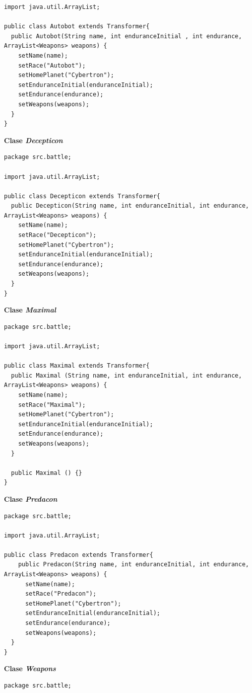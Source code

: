 \documentclass[12pt]{article}
\begin{document}
\begin{enumerate}[label = \arabic{enumi}]
\begin{lstlisting}
import java.util.ArrayList;

public class Autobot extends Transformer{
  public Autobot(String name, int enduranceInitial , int endurance, ArrayList<Weapons> weapons) {
    setName(name);
    setRace("Autobot");
    setHomePlanet("Cybertron");
    setEnduranceInitial(enduranceInitial);
    setEndurance(endurance);
    setWeapons(weapons);
  }
}    
    \end{lstlisting}
    
    \textbf{Clase \textit{Decepticon}}
    \begin{lstlisting}
package src.battle;

import java.util.ArrayList;

public class Decepticon extends Transformer{
  public Decepticon(String name, int enduranceInitial, int endurance, ArrayList<Weapons> weapons) {
    setName(name);
    setRace("Decepticon");
    setHomePlanet("Cybertron");
    setEnduranceInitial(enduranceInitial);
    setEndurance(endurance);
    setWeapons(weapons);
  }
}    
    \end{lstlisting}

    \textbf{Clase \textit{Maximal}} 
    \begin{lstlisting}
package src.battle;

import java.util.ArrayList;

public class Maximal extends Transformer{
  public Maximal (String name, int enduranceInitial, int endurance, ArrayList<Weapons> weapons) {
    setName(name);
    setRace("Maximal");
    setHomePlanet("Cybertron");
    setEnduranceInitial(enduranceInitial);
    setEndurance(endurance);
    setWeapons(weapons);
  }

  public Maximal () {}
}
    \end{lstlisting}

    \textbf{Clase \textit{Predacon}}
    \begin{lstlisting}
package src.battle;

import java.util.ArrayList;

public class Predacon extends Transformer{
    public Predacon(String name, int enduranceInitial, int endurance, ArrayList<Weapons> weapons) {
      setName(name);
      setRace("Predacon");
      setHomePlanet("Cybertron");
      setEnduranceInitial(enduranceInitial);
      setEndurance(endurance);
      setWeapons(weapons);
  }
}
    \end{lstlisting}

    \textbf{Clase \textit{Weapons}} 
    \begin{lstlisting}
package src.battle;


\end{lstlisting}
\end{enumerate}
\end{document}
